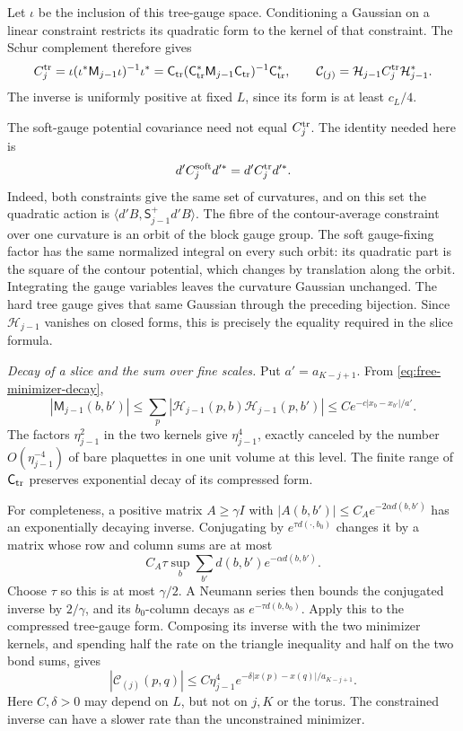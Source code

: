 \documentclass[11pt,letterpaper,reqno]{amsart}
\theoremstyle{definition}
\theoremstyle{remark}
\begin{document}
Let $\iota$ be the inclusion of this tree-gauge space. Conditioning
a Gaussian on a linear constraint restricts its quadratic form to
the kernel of that constraint. The Schur complement therefore gives
\[
 C_j^{\rm tr}
 =\iota(\iota^*\mathsf M_{j-1}\iota)^{-1}\iota^*
 =\mathsf C_{\rm tr}
  (\mathsf C_{\rm tr}^*\mathsf M_{j-1}\mathsf C_{\rm tr})^{-1}
                                      \mathsf C_{\rm tr}^*,
 \qquad
 \mathcal C_{(j)}=\mathcal H_{j-1}C_j^{\rm tr}\mathcal H_{j-1}^*.
\]
The inverse is uniformly positive at fixed $L$, since its form is
at least $c_L/4$.

The soft-gauge potential covariance need not equal $C_j^{\rm tr}$.
The identity needed here is
\[
 d'C_j^{\rm soft}d'^*=d'C_j^{\rm tr}d'^*.
\]
Indeed, both constraints give the same set of curvatures, and on
this set the quadratic action is
$\langle d'B,\mathsf S_{j-1}^+d'B\rangle$. The fibre of the
contour-average constraint over one curvature is an orbit of the
block gauge group. The soft gauge-fixing factor has the same
normalized integral on every such orbit: its quadratic part is
the square of the contour potential, which changes by translation
along the orbit. Integrating the gauge variables leaves the
curvature Gaussian unchanged. The hard tree gauge gives that same
Gaussian through the preceding bijection. Since $\mathcal H_{j-1}$
vanishes on closed forms, this is precisely the equality required
in the slice formula.

\emph{Decay of a slice and the sum over fine scales.}
Put $a'=a_{K-j+1}$. From
\eqref{eq:free-minimizer-decay},
\[
 |\mathsf M_{j-1}(b,b')|
 \le\sum_p|\mathcal H_{j-1}(p,b)\mathcal H_{j-1}(p,b')|
 \le Ce^{-c|x_b-x_{b'}|/a'}.
\]
The factors $\eta_{j-1}^2$ in the two kernels give
$\eta_{j-1}^4$, exactly canceled by the number
$O(\eta_{j-1}^{-4})$ of bare plaquettes in one unit volume at
this level. The finite range of $\mathsf C_{\rm tr}$ preserves
exponential decay of its compressed form.

For completeness, a positive matrix $A\ge\gamma I$ with
$|A(b,b')|\le C_Ae^{-2\alpha d(b,b')}$ has an exponentially
decaying inverse. Conjugating by
$e^{\tau d(\cdot,b_0)}$ changes it by a matrix whose row and
column sums are at most
\[
 C_A\tau\sup_b\sum_{b'}d(b,b')e^{-\alpha d(b,b')}.
\]
Choose $\tau$ so this is at most $\gamma/2$. A Neumann series
then bounds the conjugated inverse by $2/\gamma$, and its
$b_0$-column decays as $e^{-\tau d(b,b_0)}$.
Apply this to the compressed tree-gauge form. Composing its
inverse with the two minimizer kernels, and spending half the
rate on the triangle inequality and half on the two bond sums,
gives
\[
 |\mathcal C_{(j)}(p,q)|
 \le C\eta_{j-1}^4
          e^{-\delta|x(p)-x(q)|/a_{K-j+1}}.
\]
Here $C,\delta>0$ may depend on $L$, but not on $j,K$ or the
torus. The constrained inverse can have a slower rate than the
unconstrained minimizer.
\end{document}
